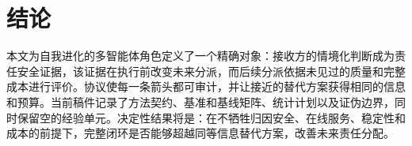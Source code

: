 \documentclass[UTF8,twocolumn]{ctexart}
\begin{document}
\section{结论}

本文为自我进化的多智能体角色定义了一个精确对象：接收方的情境化判断成为责任安全证据，该证据在执行前改变未来分派，而后续分派依据未见过的质量和完整成本进行评价。协议使每一条箭头都可审计，并让接近的替代方案获得相同的信息和预算。当前稿件记录了方法契约、基准和基线矩阵、统计计划以及证伪边界，同时保留空的经验单元。决定性结果将是：在不牺牲归因安全、在线服务、稳定性和成本的前提下，完整闭环是否能够超越同等信息替代方案，改善未来责任分配。

\begingroup
\sloppy


\endgroup
\end{document}
